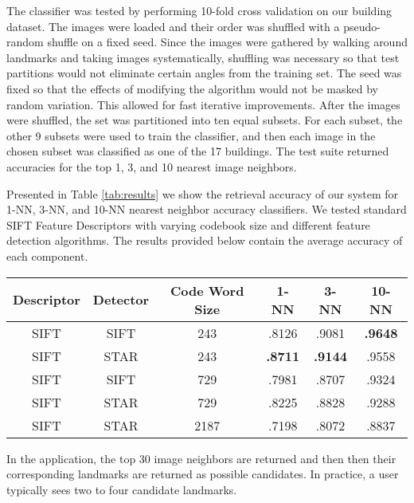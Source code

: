 The classifier was tested by performing 10-fold cross validation on our building dataset. 
The images were loaded and their order was shuffled with a pseudo-random shuffle on a fixed seed. 
Since the images were gathered by walking around landmarks and taking images systematically, shuffling was necessary so that test partitions would not eliminate certain angles from the training set. 
The seed was fixed so that the effects of modifying the algorithm would not be masked by random variation. This allowed for fast iterative improvements. After the images were shuffled, the set was partitioned into ten equal subsets. 
For each subset, the other 9 subsets were used to train the classifier, and then each image in the chosen subset was classified as one of the 17 buildings. 
The test suite returned accuracies for the top 1, 3, and 10 nearest image neighbors.


Presented in Table \ref{tab:results} we show the retrieval accuracy of our system for 1-NN, 3-NN, and 10-NN nearest neighbor accuracy classifiers.
We tested standard SIFT Feature Descriptors with varying codebook size and different feature detection algorithms.
The results provided below contain the average accuracy of each component.

\begin{table*}[ht!]
\label{tab:results}
\centering
\begin{tabular}{| c | c | c | c | c | c |}
\hline
Descriptor & Detector & Code Word Size & 1-NN & 3-NN & 10-NN\\ \hline
SIFT & SIFT & 243 & .8126 & .9081  & \textbf{.9648}  \\ \hline
SIFT & STAR & 243 & \textbf{.8711} & \textbf{.9144} & .9558 \\ \hline
SIFT & SIFT & 729 & .7981 & .8707 & .9324 \\ \hline
SIFT & STAR & 729 & .8225 & .8828 & .9288 \\ \hline
SIFT & STAR & 2187 & .7198 & .8072 & .8837\\ \hline
\end{tabular}
\vspace*{10pt}
\caption{Retrieval Accuracy}
\end{table*}

In the application, the top 30 image neighbors are returned and then then their corresponding landmarks are returned as possible candidates. In practice, a user typically sees two to four candidate landmarks.
